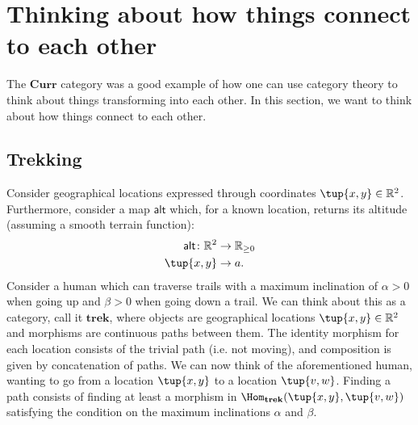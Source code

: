 \section{Thinking about how things connect to each other}
The $\mathbf{Curr}$ category was a good example of how one can use category theory to think about things transforming into each other. In this section, we want to think about how things connect to each other.
\subsection{Trekking}
\label{sec:trekking}
Consider geographical locations expressed through coordinates $\tup{x,y}\in \mathbb{R}^2$. Furthermore, consider a map $\mathsf{alt}$ which, for a known location, returns its altitude (assuming a smooth terrain function):
\begin{equation}
    \begin{aligned}
    \mathsf{alt}\colon \mathbb{R}^2&\to \mathbb{R}_{\geq 0}\\
    \tup{x,y}&\to a.
    \end{aligned}
\end{equation}
Consider a human which can traverse trails with a maximum inclination of $\alpha>0$ when going up and $\beta>0$ when going down a trail. We can think about this as a category, call it $\mathbf{trek}$, where objects are geographical locations $\tup{x,y}\in \mathbb{R}^2$ and morphisms are continuous paths between them. The identity morphism for each location consists of the trivial path (i.e. not moving), and composition is given by concatenation of paths. We can now think of the aforementioned human, wanting to go from a location $\tup{x,y}$ to a location $\tup{v,w}$. Finding a path consists of finding at least a morphism in $\Hom_\mathbf{trek}(\tup{x,y},\tup{v,w})$ satisfying the condition on the maximum inclinations $\alpha$ and $\beta$.



